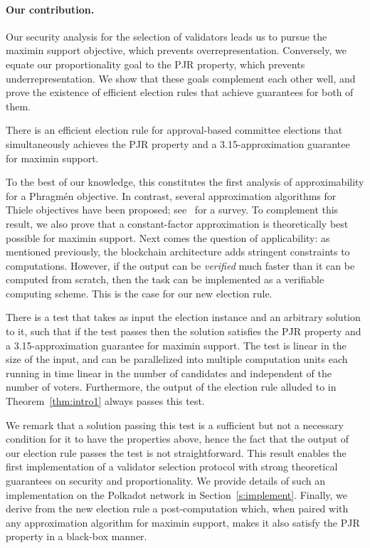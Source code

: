 \paragraph{Our contribution.}
Our security analysis for the selection of validators leads us to pursue the maximin support objective, which prevents overrepresentation. Conversely, we equate our proportionality goal to the PJR property, which prevents underrepresentation. We show that these goals complement each other well, and prove the existence of efficient election rules that achieve guarantees for both of them. 

\begin{theorem}\label{thm:intro1}
There is an efficient election rule for approval-based committee elections that simultaneously achieves the PJR property and a 3.15-approximation guarantee for maximin support.
\end{theorem}

To the best of our knowledge, this constitutes the first analysis of approximability for a Phragm\'{e}n objective. 
In contrast, several approximation algorithms for Thiele objectives have been proposed; see~\cite{lackner2020approval} for a survey. To complement this result, we also prove that a constant-factor approximation is theoretically best possible for maximin support. 
%
Next comes the question of applicability: as mentioned previously, the blockchain architecture adds stringent constraints to computations. However, if the output can be \emph{verified} much faster than it can be computed from scratch, then the task can be implemented as a verifiable computing scheme. This is the case for our new election rule.

\begin{theorem}\label{thm:intro2}
There is a test that takes as input the election instance and an arbitrary solution to it, such that if the test passes then the solution satisfies the PJR property and a 3.15-approximation guarantee for maximin support. 
The test is linear in the size of the input, and can be parallelized into multiple computation units each running in time linear in the number of candidates and independent of the number of voters. 
Furthermore, the output of the election rule alluded to in Theorem~\ref{thm:intro1} always passes this test. 
\end{theorem}

We remark that a solution passing this test is a sufficient but not a necessary condition for it to have the properties above, hence the fact that the output of our election rule passes the test is not straightforward.
This result enables the first implementation of a validator selection protocol with strong theoretical guarantees on security and proportionality. 
We provide details of such an implementation on the Polkadot network in Section~\ref{s:implement}.
%
Finally, we derive from the new election rule a post-computation which, when paired with any approximation algorithm for maximin support, makes it also satisfy the PJR property in a black-box manner.

